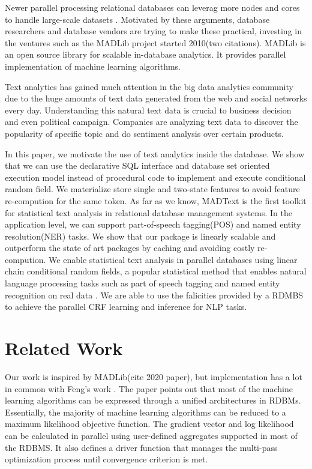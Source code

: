 \documentclass[11pt,letterpaper]{article}
\begin{document}
Newer parallel processing relational databases can leverag more nodes and cores to handle large-scale datasets
 \cite{DeWitt:1992:PDS:129888.129894}. 
Motivated by these arguments, database researchers and database vendors are trying to make these practical,
investing in the ventures such as the MADLib project started 2010(two citations). 
MADLib is an open source library for scalable in-database analytics.
It provides parallel implementation of machine learning algorithms.

Text analytics has gained much attention in the big data analytics community due to the huge amounts of text data generated from the web and 
social networks every day.
Understanding this natural text data is crucial to business decision and even political campaign. 
Companies are analyzing text data to discover the popularity of specific topic and do sentiment analysis over certain products.

In this paper, we motivate the use of text analytics inside the database.
We show that we can use the declarative SQL interface and database set oriented execution model instead of procedural code to 
implement and execute 
conditional random field. 
We materialize  store single and two-state features to avoid feature re-compution for the same token.  
As far as we know, MADText is the first toolkit for statistical text analysis in relational database management systems.  
In the application level, we can support part-of-speech tagging(POS) and  named entity resolution(NER) tasks.  
We show that our package is linearly scalable and outperform the state of art packages by caching and avoiding costly re-compution.
We enable statistical text analysis in parallel databases using linear chain conditional random fields, a
popular statistical method that enables
natural language processing tasks such as part of speech tagging and named entity recognition on
real data \cite{DBLP:conf/icml/LaffertyMP01}.
We are able to use the falicities provided by a RDMBS to achieve the parallel CRF learning and inference for NLP tasks.

\section{Related Work}
Our work is inspired by MADLib(cite 2020 paper), but implementation has a lot in common with Feng's work \cite{Feng:2012:TUA:2213836.2213874}.
The paper points out that most of the machine learning algorithms can be expressed through
a unified architectures in RDBMs.
Essentially, the majority of machine learning algorithms can be reduced to a maximum likelihood objective function. %
The gradient vector and log likelihood can be calculated in parallel using user-defined aggregates supported in most of the RDBMS.
It also defines a driver function that manages the multi-pass optimization process until convergence criterion is met.
\end{document}
